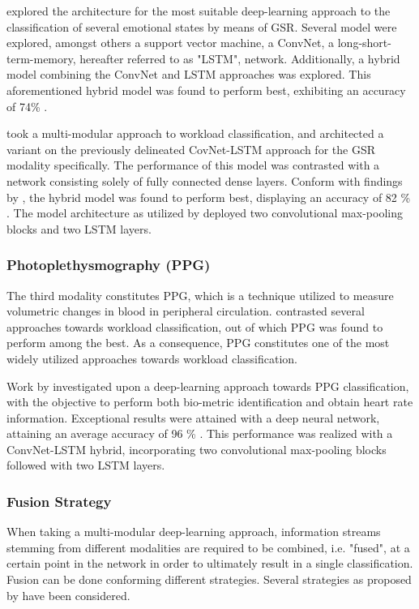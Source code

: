 \documentclass[12pt]{article}
\begin{document}
 explored the architecture for the most suitable deep-learning approach to the classification of several emotional states by means of GSR. Several model were explored, amongst others a support vector machine, a ConvNet, a long-short-term-memory, hereafter referred to as "LSTM", network. Additionally, a hybrid model combining the ConvNet and LSTM approaches was explored. This aforementioned hybrid model was found to perform best, exhibiting an accuracy of 74\% \cite{sun2019hybrid}. 

 took a multi-modular approach to workload classification, and architected a variant on the previously delineated CovNet-LSTM approach for the GSR modality specifically. The performance of this model was contrasted with a network consisting solely of fully connected dense layers. Conform with findings by  , the hybrid model was found to perform best, displaying an accuracy of 82 \% \cite{dolmans2020perceived}. The model architecture as utilized by  deployed two convolutional max-pooling blocks and two LSTM layers.

\subsubsection{Photoplethysmography (PPG)}
The third modality constitutes PPG, which is a technique utilized to measure volumetric changes in blood in peripheral circulation.  contrasted several approaches towards workload classification, out of which PPG was found to perform among the best. As a consequence, PPG constitutes one of the most widely utilized approaches towards workload classification. 

Work by  investigated upon a deep-learning approach towards PPG classification, with the objective to perform both bio-metric identification and obtain heart rate information. Exceptional results were attained with a deep neural network, attaining an average accuracy of 96 \% \cite{biswas2019cornet}. This performance was realized with a ConvNet-LSTM hybrid, incorporating two convolutional max-pooling blocks followed with two LSTM layers. 

\subsubsection{Fusion Strategy}  
When taking a multi-modular deep-learning approach, information streams stemming from different modalities are required to be combined, i.e. "fused", at a certain point in the network in order to ultimately result in a single classification. Fusion can be done conforming different strategies. Several strategies as proposed by  have been considered.
\end{document}

